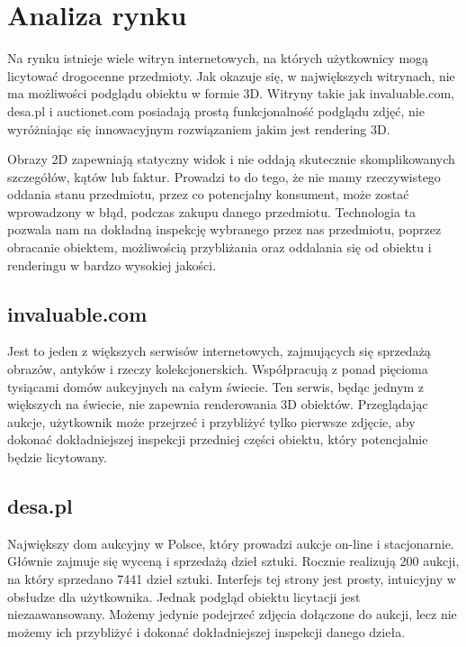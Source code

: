 \section{Analiza rynku}

Na rynku istnieje wiele witryn internetowych, na których użytkownicy mogą licytować drogocenne przedmioty. Jak okazuje się, w największych witrynach, nie ma możliwości podglądu obiektu w formie 3D. Witryny takie jak invaluable.com, desa.pl i auctionet.com posiadają prostą funkcjonalność podglądu zdjęć, nie wyróżniając się innowacyjnym rozwiązaniem jakim jest rendering 3D.

Obrazy 2D zapewniają statyczny widok i nie oddają skutecznie skomplikowanych szczegółów, kątów lub faktur. Prowadzi to do tego, że nie mamy rzeczywistego oddania stanu przedmiotu, przez co potencjalny konsument, może zostać wprowadzony w błąd, podczas zakupu danego przedmiotu. Technologia ta pozwala nam na dokładną inspekcję wybranego przez nas przedmiotu, poprzez obracanie obiektem, możliwością przybliżania oraz oddalania się od obiektu i renderingu w bardzo wysokiej jakości.

\subsection{invaluable.com}
Jest to jeden z większych serwisów internetowych, zajmujących się sprzedażą obrazów, antyków i rzeczy kolekcjonerskich. Współpracują z ponad pięcioma tysiącami domów aukcyjnych na całym świecie. Ten serwis, będąc jednym z większych na świecie, nie zapewnia renderowania 3D obiektów. Przeglądając aukcje, użytkownik może przejrzeć i przybliżyć tylko pierwsze zdjęcie, aby dokonać dokładniejszej inspekcji przedniej części obiektu, który potencjalnie będzie licytowany.


\subsection{desa.pl}
Największy dom aukcyjny w Polsce, który prowadzi aukcje on-line i stacjonarnie. Głównie zajmuje się wyceną i sprzedażą dzieł sztuki. Rocznie realizują 200 aukcji, na który sprzedano 7441 dzieł sztuki. Interfejs tej strony jest prosty, intuicyjny w obsłudze dla użytkownika. Jednak podgląd obiektu licytacji jest niezaawansowany. Możemy jedynie podejrzeć zdjęcia dołączone do aukcji, lecz nie możemy ich przybliżyć i dokonać dokładniejszej inspekcji danego dzieła.

